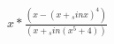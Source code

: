 \documentclass{proc}
\begin{document}
$ { {  x  } * \frac{{( {  x  } - { {( {  x  } + {  _sin {  x  } } )} ^ {  4  } } )}}{{( {  x  } + {  _sin {( { {  x  } ^ {  5  } } + {  4  } )} } )} } } $
\end{document}

